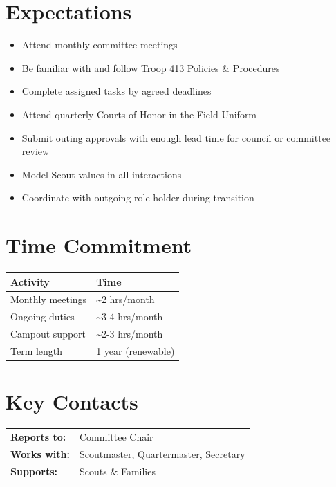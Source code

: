 \documentclass[11pt, letterpaper]{article}
\begin{document}
\hfill
\begin{minipage}[t]{0.48\linewidth}
\raggedright

\section{Expectations}
\begin{itemize}
  \item Attend monthly committee meetings
  \item Be familiar with and follow Troop 413 Policies \& Procedures
  \item Complete assigned tasks by agreed deadlines
  \item Attend quarterly Courts of Honor in the Field Uniform
  \item Submit outing approvals with enough lead time for council or committee review
  \item Model Scout values in all interactions
  \item Coordinate with outgoing role-holder during transition
\end{itemize}

\section{Time Commitment}
\begin{tabular}{@{}p{3.0cm} p{3.8cm}@{}}
  \toprule
  \textbf{Activity} & \textbf{Time} \\
  \midrule
  Monthly meetings  & \textasciitilde{}2 hrs/month \\
  Ongoing duties    & \textasciitilde{}3-4 hrs/month \\
  Campout support   & \textasciitilde{}2-3 hrs/month \\
  Term length       & 1 year (renewable) \\
  \bottomrule
\end{tabular}

\vspace{1em}

\section{Key Contacts}
\begin{tabular}{@{}p{2.6cm} >{\raggedright\arraybackslash}p{4.2cm}@{}}
  \textbf{Reports to:}  & Committee Chair \\
  \textbf{Works with:}  & Scoutmaster, Quartermaster, Secretary \\
  \textbf{Supports:}    & Scouts \& Families \\
\end{tabular}

\end{minipage}
\end{document}

